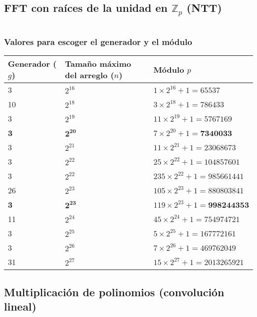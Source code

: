 \documentclass[11pt]{article}
\begin{document}
		\subsection{FFT con raíces de la unidad en $\mathbb{Z}_p$ (NTT)}
		\inputminted[tabsize=2,breaklines,firstline=46,lastline=83,fontsize=\small]{c++}{fft.cpp}
			\subsubsection{Valores para escoger el generador y el módulo}
				\begin{table}[H]
					\centering
					\begin{tabular}{|p{2.3cm}|p{2.7cm}|p{4.5cm}|}
						\hline
						Generador ($g$) & Tamaño máximo del arreglo ($n$) & Módulo $p$ \\ \hline
						3 & $2^{16}$ & $1 \times 2^{16} + 1 = 65537$ \\ \hline
						10 & $2^{18}$ & $3 \times 2^{18} + 1 = 786433$ \\ \hline
						3 & $2^{19}$ & $11 \times 2^{19} + 1 = 5767169$ \\ \hline
						\textbf{3} & $\mathbf{2^{20}}$ & $7 \times 2^{20} + 1 = \textbf{7340033}$ \\ \hline
						3 & $2^{21}$ & $11 \times 2^{21} + 1 = 23068673$ \\ \hline
						3 & $2^{22}$ & $25 \times 2^{22} + 1 = 104857601$ \\ \hline
						3 & $2^{22}$ & $235 \times 2^{22} + 1 = 985661441$ \\ \hline
						26 & $2^{23}$ & $105 \times 2^{23} + 1 = 880803841$ \\ \hline
						\textbf{3} & $\mathbf{2^{23}}$ & $119 \times 2^{23} + 1 = \textbf{998244353}$ \\ \hline
						11 & $2^{24}$ & $45 \times 2^{24} + 1 = 754974721$ \\ \hline
						3 & $2^{25}$ & $5 \times 2^{25} + 1 = 167772161$ \\ \hline
						3 & $2^{26}$ & $7 \times 2^{26} + 1 = 469762049$ \\ \hline
						31 & $2^{27}$ & $15 \times 2^{27} + 1 = 2013265921$ \\ \hline
					\end{tabular}
				\end{table}
			
		\subsection{Multiplicación de polinomios (convolución lineal)}
		\inputminted[tabsize=2,breaklines,firstline=85,lastline=110,fontsize=\small]{c++}{fft.cpp}
		
\end{document}
